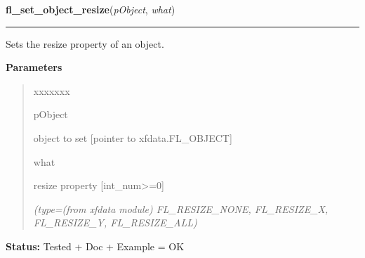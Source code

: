 \hspace{.8\funcindent}\begin{boxedminipage}{\funcwidth}

    \raggedright \textbf{fl\_set\_object\_resize}(\textit{pObject}, \textit{what})

    \vspace{-1.5ex}

    \rule{\textwidth}{0.5\fboxrule}
\setlength{\parskip}{2ex}
    Sets the resize property of an object.

\setlength{\parskip}{1ex}
      \textbf{Parameters}
      \vspace{-1ex}

      \begin{quote}
        \begin{Ventry}{xxxxxxx}

          \item[pObject]

          object to set [pointer to xfdata.FL\_OBJECT]

          \item[what]

          resize property [int\_num{\textgreater}=0]

            {\it (type=(from xfdata module) FL\_RESIZE\_NONE, FL\_RESIZE\_X, FL\_RESIZE\_Y, 
FL\_RESIZE\_ALL)}

        \end{Ventry}

      \end{quote}

\textbf{Status:} Tested + Doc + Example = OK



    \end{boxedminipage}

    \label{xformslib:library:fl_get_object_resize}

    \vspace{0.5ex}

